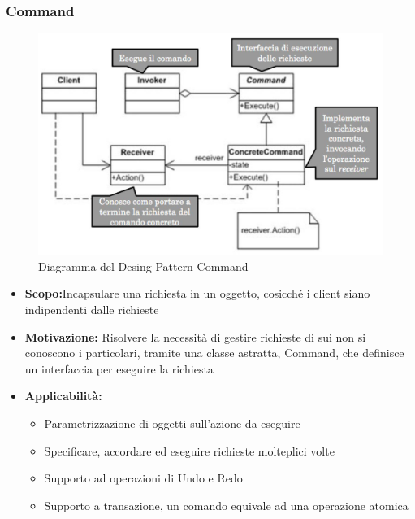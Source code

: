 \documentclass[a4paper]{article}
\begin{document}
	\subsubsection{Command}
				\begin{figure}[H]
					\centering
					\includegraphics[scale=0.65]{immagini/ST/schemacomand.jpg}
					\caption{Diagramma del Desing Pattern Command}
				\end{figure}
            \begin{itemize}
				\item \textbf{Scopo:}Incapsulare una richiesta in un oggetto, cosicché i client siano indipendenti dalle richieste 
                \item \textbf{Motivazione:}
                Risolvere la necessità di gestire richieste di sui non si conoscono i particolari, tramite una classe astratta, Command, che definisce un interfaccia per eseguire la richiesta
                \item \textbf{Applicabilità:}
					\begin{itemize}
						\item Parametrizzazione di oggetti sull'azione da eseguire
						\item Specificare, accordare ed eseguire richieste molteplici volte
						\item Supporto ad operazioni di Undo e Redo
						\item Supporto a transazione, un comando equivale ad una operazione atomica
					\end{itemize}		
			\end{itemize}
				
\end{document}
